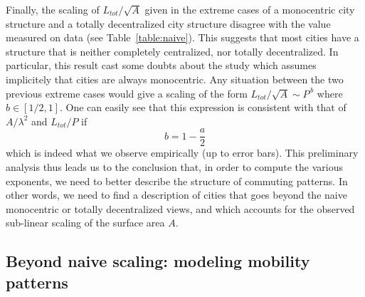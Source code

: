 Finally, the scaling of $L_{tot}/\sqrt{A}$ given in the extreme cases of a monocentric city structure and a totally decentralized city structure disagree with the value measured on data (see Table~\ref{table:naive}). This suggests that most cities have a structure that is neither completely centralized, nor totally decentralized. In particular, this result cast some doubts about the study \cite{Bettencourt:2013} which assumes implicitely that cities are always monocentric.
Any situation between the two previous extreme cases would give a scaling of the form $L_{tot}/\sqrt{A}\sim P^{\,b}$ where $b \in [1/2,1]$. One can easily see that this expression is consistent with that of $A/\lambda^2$ and $L_{tot}/P$ if
%
\begin{equation}
b = 1-\frac{a}{2}
\label{eq:consis}
\end{equation}
%
which is indeed what we observe empirically (up to error bars). This preliminary analysis thus leads us to the conclusion that, in order to compute the various exponents, we need to better describe the structure of commuting patterns. In other words, we need to find a description of cities that goes beyond the naive monocentric or totally decentralized views, and which accounts for the observed sub-linear scaling of the surface area $A$.

\subsection{Beyond naive scaling: modeling mobility patterns}
%

